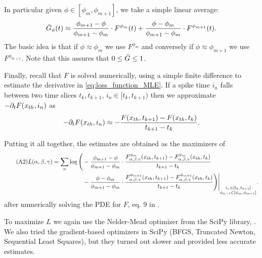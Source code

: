 \documentclass{article}
\begin{document}
In particular given $\phi \in [\phi_m, \phi_{m+1}]$, we take a simple
linear average:
$${ \bar{G} }_\phi(t) \approx
\frac{\phi_{m+1} - \phi}{\phi_{m+1} - \phi_{m}} \cdot F^{\phi_m}(t)
+ 
\frac{\phi - \phi_{m}}{\phi_{m+1} - \phi_{m}} \cdot F^{\phi_{m+1}}(t).
$$
The basic idea is that if $\phi \approx \phi_m$ we use $F^{\phi_m}$ and
conversely if $\phi \approx \phi_{m+1}$ we use $F^{\phi_{m+1}}$.
Note that this assures that $0 \leq { \bar{G} } \leq 1$.

Finally, recall that $F$ is solved numerically, using a simple finite difference
to estimate the derivative in \cref{eq:loss_function_MLE}. If a spike time $i_n$
falls between two time slices $t_k, t_{k+1}$, $i_n \in [t_k, t_{k+1})$ then we approximate $-{\partial}_t F({ x_{th} }, i_n)$ as $$ -{\partial}_t F({ x_{th} }, i_n)
\approx -\frac{F({ x_{th} }, t_{k+1}) - F({ x_{th} }, t_{k})}{t_{k+1} - t_{k}}. $$


Putting it all together, the estimates are obtained as the maximizers of 
\begin{align}
\tag{A2}
\label{eq:loss_function_ML}
L({\alpha},{\beta},{\gamma }) = \sum_n  \log \Bigg(
&-\frac{\phi_{m+1} - \phi}{\phi_{m+1} - \phi_{m}} \cdot 
\frac{F_{{\alpha},{\beta},{\gamma }}^{\phi_m}({ x_{th} }, t_{k+1}) - F_{{\alpha},{\beta},{\gamma }}^{\phi_m}({ x_{th} },
t_{k})}{t_{k+1} - t_{k}}
\\&-
\frac{\phi - \phi_{m}}{\phi_{m+1} - \phi_{m}} \cdot 
\frac{F_{{\alpha},{\beta},{\gamma }}^{\phi_{m+1}}({ x_{th} }, t_{k+1}) - F_{{\alpha},{\beta},{\gamma }}^{\phi_{m+1}}({ x_{th} },
t_{k})}{t_{k+1} - t_{k}} 
 \Bigg)
 \Bigg|_{\substack{i_n \in [t_k, t_{k+1}] \\
 			 \phi_{n-1} \in [\phi_m, \phi_{m+1}]}} .
 			 \notag
\end{align} 
after numerically solving the PDE for $F$, eq. 9 in \cite{Iolov2013}. 

To maximize $L$ we again use the Nelder-Mead optimizer from the SciPy library,
\cite{scipy}. We also tried the gradient-based optimizers in SciPy (BFGS,
Truncated Newton, Sequential Least Squares), but they turned out slower and
provided less accurate estimates.
  
\end{document}
